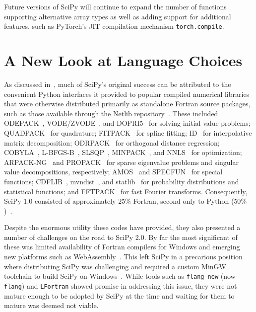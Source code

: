 \documentclass[acmsmall]{acmart}
\begin{document}
Future versions of SciPy will continue to expand the number of functions supporting
alternative array types as well as adding support for additional features, such as
PyTorch's JIT compilation mechanism \texttt{torch.compile}.

\section{A New Look at Language Choices}

As discussed in~\cite{Virtanen2020}, much of SciPy's original success can be attributed
to the convenient Python interfaces it provided to popular compiled numerical libraries
that were otherwise distributed primarily as standalone Fortran source
packages, such as those available through the Netlib repository~\cite{netlib}.
These included
ODEPACK~\cite{Hindmarsh1983ODEPACK},
VODE/ZVODE~\cite{Brown1989}, and DOPRI5~\cite{Hairer1987} for solving initial value
problems; QUADPACK~\cite{Piessens1983} for quadrature; FITPACK~\cite{dierckx1995curve}
for spline fitting; ID~\cite{martinsson2008id,Halko2011} for interpolative
matrix decomposition; ODRPACK~\cite{Boggs1989}
for orthogonal distance regression; COBYLA~\cite{Powell1994}, L-BFGS-B~\cite{Morales2011},
SLSQP~\cite{Kraft1994,Kraft1988SQP}, MINPACK~\cite{More1980}, and
NNLS~\cite{Lawson1995} for optimization;
ARPACK-NG~\cite{Lehoucq2023ARPACKNG} and PROPACK~\cite{Larsen1998} for sparse eigenvalue problems
and singular value decompositions, respectively; AMOS~\cite{Amos1986} and
SPECFUN~\cite{Zhang1996} for special functions;
CDFLIB~\cite{Brown1994CDFLIB}, mvndist~\cite{Genz1992}, and
statlib~\cite{Dinneen1976,Best1975,Royston1995,Maclaren1985} for probability
distributions and statistical functions;
and FFTPACK~\cite{Swarztrauber1982} for fast Fourier transforms.
Consequently, SciPy 1.0 consisted of approximately $25\%$ Fortran,
second only to Python ($50\%$)~\cite{Virtanen2020}.

Despite the enormous utility these codes have provided, they also presented a number
of challenges on the road to SciPy 2.0. By far the most significant of these was
limited availability of Fortran compilers for Windows and
emerging new platforms such as WebAssembly~\cite{Haas2017}. This left SciPy
in a precarious position where distributing SciPy was challenging and required
a custom MinGW toolchain to build SciPy on Windows~\cite{obermeier2023eu}.
While tools such as \texttt{flang-new} (now \texttt{flang})
and \texttt{LFortran} showed promise in addressing this issue, they were not
mature enough to be adopted by SciPy at the time and waiting for them to mature was
deemed not viable.
\end{document}
